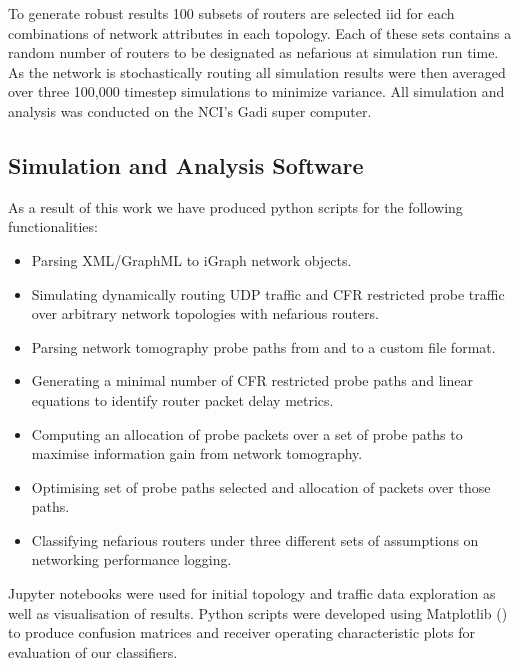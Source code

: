 To generate robust results 100 subsets of routers are selected iid for each combinations of network attributes in each topology. Each of these sets contains a random number of routers to be designated as nefarious at simulation run time. As the network is stochastically routing all simulation results were then averaged over three 100,000 timestep simulations to minimize variance. All simulation and analysis was conducted on the NCI's Gadi super computer.\par

\subsection{Simulation and Analysis Software}
\label{ssec:Msoftware}
As a result of this work we have produced python scripts for the following functionalities:
\begin{itemize}
    \item Parsing XML/GraphML to iGraph network objects.
    \item Simulating dynamically routing UDP traffic and CFR restricted probe traffic over arbitrary network topologies with nefarious routers.
    \item Parsing network tomography probe paths from and to a custom file format.
    \item Generating a minimal number of CFR restricted probe paths and linear equations to identify router packet delay metrics.
    \item Computing an allocation of probe packets over a set of probe paths to maximise information gain from network tomography.
    \item Optimising set of probe paths selected and allocation of packets over those paths.
    \item Classifying nefarious routers under three different sets of assumptions on networking performance logging.
\end{itemize}
Jupyter notebooks were used for initial topology and traffic data exploration as well as visualisation of results. Python scripts were developed using Matplotlib (\cite{hunter_matplotlib_2007}) to produce confusion matrices and receiver operating characteristic plots for evaluation of our classifiers.

